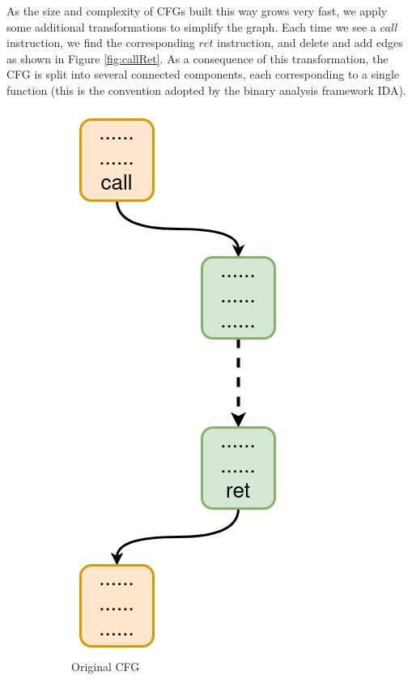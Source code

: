 \documentclass[french]{article}
\begin{document}
As the size and complexity of CFGs built this way grows very fast, we apply some additional transformations to simplify the graph. Each time we see a $call$ instruction, we find the corresponding $ret$ instruction, and delete and add edges as shown in Figure \ref{fig:callRet}. As a consequence of this transformation, the CFG is split into several connected components, each corresponding to a single function (this is the convention adopted by the binary analysis framework IDA).

\begin{figure}[htp]
	\centering
	\begin{subfigure}{.5\textwidth}
		\centering 	
		\includegraphics[width=.4\linewidth]{img/CallRetBefore.png}
		\caption{Original CFG}
	\end{subfigure}%
	\begin{subfigure}{.5\textwidth}
		\centering 	

\end{subfigure}
\end{figure}
\end{document}

